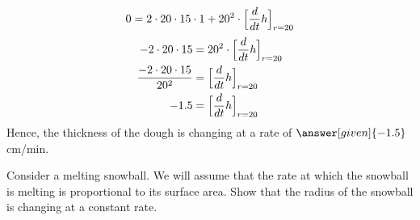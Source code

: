 \documentclass{ximera}
\begin{document}
\begin{example}
\begin{explanation}
 \[
 0 = 2\cdot 20 \cdot 15 \cdot 1 + 20^2 \cdot \Bigl[\frac{d}{dt}h\Bigr]_{r=20}
  \]
  \begin{align*}
    -2\cdot 20 \cdot 15  &= 20^2 \cdot  \Bigl[\frac{d}{dt}h\Bigr]_{r=20}\\
    \frac{-2\cdot 20 \cdot 15}{20^2}  &=  \Bigl[\frac{d}{dt}h\Bigr]_{r=20}\\
    -1.5  &=  \Bigl[\frac{d}{dt}h\Bigr]_{r=20}
  \end{align*}
  Hence, the thickness of the dough is changing at a rate of $\answer[given]{-1.5}$
  cm/min.
\end{explanation}
\end{example}



\begin{example}
  Consider a melting snowball. We will assume that the rate at which the
  snowball is melting is proportional to its surface area. Show that
  the radius of the snowball is changing at a constant rate.
  

\end{example}
\end{document}

